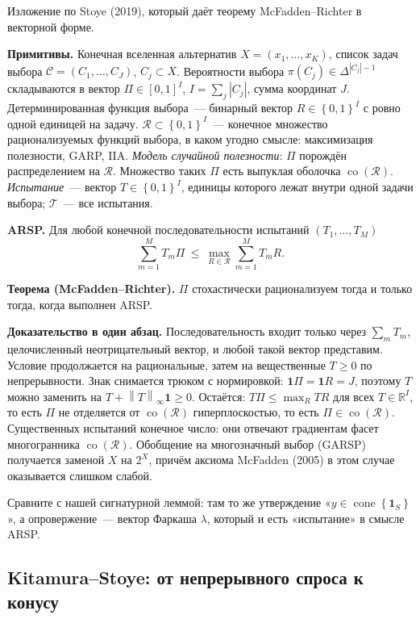 \documentclass[a4paper,11pt]{article}
\theoremstyle{plain}
\theoremstyle{definition}
\theoremstyle{remark}
\newcommand{\R}{\mathbb{R}}
\newcommand{\norm}[1]{\left\lVert #1 \right\rVert}
\newcommand{\set}[1]{\left\{ #1 \right\}}
\DeclareMathOperator{\cone}{cone}
\DeclareMathOperator{\co}{co}
\begin{document}
Изложение по Stoye (2019), который даёт теорему McFadden--Richter в векторной форме.

\textbf{Примитивы.} Конечная вселенная альтернатив $X=(x_1,\dots,x_K)$, список задач выбора $\mathcal C=(C_1,\dots,C_J)$, $C_j\subset X$. Вероятности выбора $\pi(C_j)\in\Delta^{|C_j|-1}$ складываются в вектор $\Pi\in[0,1]^I$, $I=\sum_j|C_j|$, сумма координат $J$. Детерминированная функция выбора~--- бинарный вектор $R\in\set{0,1}^I$ с ровно одной единицей на задачу. $\mathcal R\subset\set{0,1}^I$~--- конечное множество рационализуемых функций выбора, в каком угодно смысле: максимизация полезности, GARP, IIA. \textit{Модель случайной полезности}: $\Pi$ порождён распределением на $\mathcal R$. Множество таких $\Pi$ есть выпуклая оболочка $\co(\mathcal R)$. \textit{Испытание}~--- вектор $T\in\set{0,1}^I$, единицы которого лежат внутри одной задачи выбора; $\mathcal T$~--- все испытания.

\textbf{ARSP.} Для любой конечной последовательности испытаний $(T_1,\dots,T_M)$
\[
    \sum_{m=1}^MT_m\Pi\ \le\ \max_{R\in\mathcal R}\sum_{m=1}^MT_mR.
\]

\textbf{Теорема (McFadden--Richter).} $\Pi$ стохастически рационализуем тогда и только тогда, когда выполнен ARSP.

\textbf{Доказательство в один абзац.} Последовательность входит только через $\sum_mT_m$, целочисленный неотрицательный вектор, и любой такой вектор представим. Условие продолжается на рациональные, затем на вещественные $T\ge0$ по непрерывности. Знак снимается трюком с нормировкой: $\mathbf 1\Pi=\mathbf 1R=J$, поэтому $T$ можно заменить на $T+\norm{T}_\infty\mathbf 1\ge0$. Остаётся: $T\Pi\le\max_RTR$ для всех $T\in\R^I$, то есть $\Pi$ не отделяется от $\co(\mathcal R)$ гиперплоскостью, то есть $\Pi\in\co(\mathcal R)$. Существенных испытаний конечное число: они отвечают градиентам фасет многогранника $\co(\mathcal R)$. Обобщение на многозначный выбор (GARSP) получается заменой $X$ на $2^X$, причём аксиома McFadden (2005) в этом случае оказывается слишком слабой.

Сравните с нашей сигнатурной леммой: там то же утверждение «$y\in\cone\set{\mathbf 1_S}$», а опровержение~--- вектор Фаркаша $\lambda$, который и есть «испытание» в смысле ARSP.

\subsection{Kitamura--Stoye: от непрерывного спроса к конусу}
\end{document}

